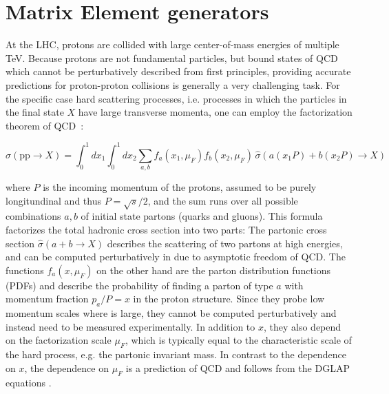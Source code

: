 \section{Matrix Element generators}
\label{sec:mc:me}


At the LHC, protons are collided with large center-of-mass energies of multiple TeV. Because protons are not fundamental particles, but bound states of QCD which cannot be perturbatively described from first principles, providing accurate predictions for proton-proton collisions is generally a very challenging task. For the specific case hard scattering processes, i.e. processes in which the particles in the final state $X$ have large transverse momenta, one can employ the factorization theorem of QCD~\cite{Peskin:1995ev}:

\begin{equation}
\label{eq:mc:sigmahad}
    \sigma (\mathrm{pp} \rightarrow X) = \int_{0}^{1} dx_1 \int_{0}^{1} dx_2 \sum_ {a,b} f_a (x_1, \mu_F) f_b (x_2, \mu_F) \, \hat{\sigma} (a (x_1 P) + b (x_2 P) \rightarrow X)
\end{equation}

\noindent where $P$ is the incoming momentum of the protons, assumed to be purely longitundinal and thus $P = \sqrt{s}/2$, and the sum runs over all possible combinations $a,b$ of initial state partons (quarks and gluons). This formula factorizes the total hadronic cross section into two parts: The partonic cross section $\hat{\sigma} (a + b \rightarrow X)$ describes the scattering of two partons at high energies, and can be computed perturbatively in \alphas due to asymptotic freedom of QCD. The functions $f_a(x, \mu_F)$  on the other hand are the parton distribution functions (PDFs) and describe the probability of finding a parton of type $a$ with momentum fraction $p_a / P = x$ in the proton structure. Since they probe low momentum scales where \alphas is large, they cannot be computed perturbatively and instead need to be measured experimentally. In addition to $x$, they also depend on the factorization scale $\mu_F$, which is typically equal to the characteristic scale of the hard process, e.g. the partonic invariant mass. In contrast to the dependence on $x$, the dependence on $\mu_F$ is a prediction of QCD and follows from the DGLAP equations .

